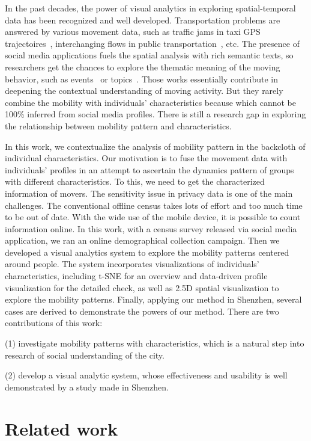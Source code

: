 In the past decades, the power of visual analytics in exploring spatial-temporal data has been recognized and well developed. Transportation problems are answered by various movement data, such as traffic jams in taxi GPS trajectoires~\citep{wang2013visual}, interchanging flows in public transportation~\citep{zeng2013visualizing}, etc. The presence of social media applications fuels the spatial analysis with rich semantic texts, so researchers get the chances to explore the thematic meaning of the moving behavior, such as events~\citep{chen2017map} or topics~\citep{bosch2013scatterblogs2}. Those works essentially contribute in deepening the contextual understanding of moving activity. But they rarely combine the mobility with individuals' characteristics because which cannot be 100\% inferred from social media profiles. There is still a research gap in exploring the relationship between mobility pattern and characteristics.


In this work, we contextualize the analysis of mobility pattern in the backcloth of individual characteristics. Our motivation is to fuse the movement data with individuals' profiles in an attempt to ascertain the dynamics pattern of groups with different characteristics. To this, we need to get the characterized information of movers. The sensitivity issue in privacy data is one of the main challenges. The conventional offline census takes lots of effort and too much time to be out of date. With the wide use of the mobile device, it is possible to count information online. In this work, with a census survey released via social media application, we ran an online demographical collection campaign. Then we developed a visual analytics system to explore the mobility patterns centered around people. The system incorporates visualizations of individuals' characteristics, including t-SNE for an overview and data-driven profile visualization for the detailed check, as well as 2.5D spatial visualization to explore the mobility patterns. Finally, applying our method in Shenzhen, several cases are derived to demonstrate the powers of our method. There are two contributions of this work:

(1) investigate mobility patterns with characteristics, which is a natural step into research of social understanding of the city.

(2) develop a visual analytic system, whose effectiveness and usability is well demonstrated by a study made in Shenzhen.



\section{Related work}

